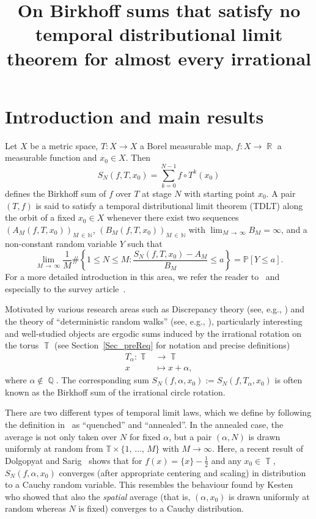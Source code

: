 \documentclass[AHL,Unicode,longabstracts,published]{cedram}
\title[On Birkhoff sums that satisfy no temporal distributional limit]{On Birkhoff sums that satisfy no temporal distributional limit theorem for almost every irrational}
\author[\initial{L.} \lastname{Fr\"uhwirth}]{\firstname{Lorenz} \lastname{Fr\"uhwirth}}
\author[\initial{M.} \lastname{Hauke}]{\firstname{Manuel} \lastname{Hauke}}
\DeclareMathOperator{\R}{\mathbb{R}}
\DeclareMathOperator{\Q}{\mathbb{Q}}
\DeclareMathOperator{\T}{\mathbb{T}}
\newcommand{\bbN}{\mathbb{N}}
\newcommand{\bbT}{\mathbb{T}}
\newcommand{\bbP}{\mathbb{P}}
\newcommand{\bbT}{\mathbb{T}}
\begin{document}
\maketitle

\section{Introduction and main results}

Let $X$ be a metric space, $T : X \to X$ a Borel measurable map, $f: X \to \R$ a measurable function and $x_0 \in X$. Then
\[
S_N(f,T,x_0) = \sum_{k=0}^{N-1} f \circ T^k(x_0)
\]
defines the Birkhoff sum of $f$ over $T$ at stage $N$ with starting point $x_0$. A pair $(T,f)$ is said to satisfy a temporal distributional limit theorem (TDLT) along the orbit of a fixed $x_0 \in X$ whenever there exist two sequences $(A_M(f,T,x_0))_{M\,\in\,\bbN}$, $(B_M(f,T,x_0))_{M\,\in\,\bbN}$ with $\lim_{M\,\to\,\infty} B_M = \infty$, and a non-constant random variable $Y$ such that
\begin{equation}\label{TLT}
\lim_{M\,\to\,\infty} \frac{1}{M} \# \left\{1 \leq N \leq M: \frac{S_N(f,T,x_0) - A_M}{B_M} \leq a\right\} = \bbP[Y \leq a].
\end{equation}
For a more detailed introduction in this area, we refer the reader to~\cite{brom_ulc} and especially to the survey article~\cite{dol_fay}.

Motivated by various research areas such as Discrepancy theory (see, e.g., \cite{beck2,beck3,schmidt}) and the theory of ``deterministic random walks'' (see, e.g., \cite{addo,aake}), particularly interesting and well-studied objects are ergodic sums induced by the irrational rotation on the torus $\T $ (see Section~\ref{Sec_preReq} for notation and precise definitions)
\begin{align*}
T_{\alpha}: \T & \to \T\\
x &\mapsto x + \alpha,
\end{align*}
where $\alpha \notin \Q$. The corresponding sum $S_N(f,\alpha,x_0) := S_N(f,T_\alpha,x_0)$ is often known as the Birkhoff sum of the irrational circle rotation.

There are two different types of temporal limit laws, which we define by following the definition in~\cite{quenched} as ``quenched'' and ``annealed''. In the annealed case, the average is not only taken over $N$ for fixed $\alpha$, but a pair $(\alpha,N)$ is drawn uniformly at random from $\bbT \times \{1,\,\ldots,\,M\}$ with $M \to \infty$. Here, a recent result of Dolgopyat and Sarig~\cite{quenched} shows that for $f(x) = \{x\} - \frac{1}{2}$ and any $x_0 \in \T$, $S_N(f,\alpha,x_0)$ converges (after appropriate centering and scaling) in distribution to a Cauchy random variable. This resembles the behaviour found by Kesten~\cite{Kesten1960} who showed that also the \emph{spatial} average (that is, $(\alpha,x_0)$ is drawn uniformly at random whereas $N$ is fixed) converges to a Cauchy distribution.
\end{document}
